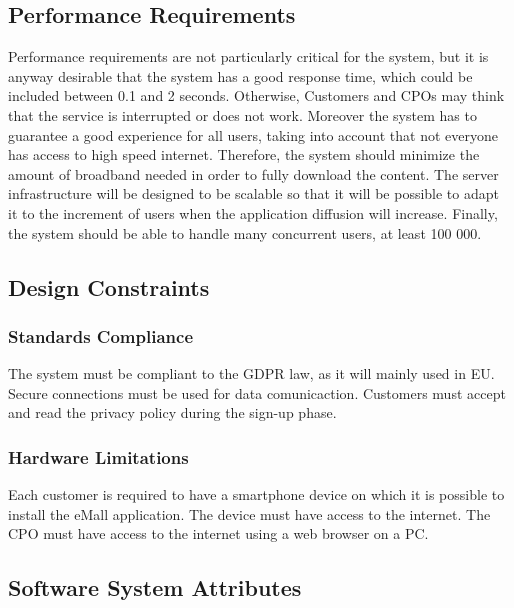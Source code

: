 \subsection{Performance Requirements}

Performance requirements are not particularly critical for the system, but it is anyway desirable that the system has a good response time, which could be included between 0.1 and 2 seconds.
Otherwise, Customers and CPOs may think that the service is interrupted or does not work.
Moreover the system has to guarantee a good experience for all users, taking into account that not everyone has access to high speed internet. Therefore,
the system should minimize the amount of broadband needed in order to fully
download the content.
The server infrastructure will be designed to be scalable so that it will be possible to adapt it to
the increment of users when the application diffusion will increase.
Finally, the system should be able to handle many concurrent users, at least
100 000.
\subsection{Design Constraints}
\subsubsection{Standards Compliance}

The system must be compliant to the GDPR law, as it will mainly used in EU. \newline
Secure connections must be used for data comunicaction. \newline
Customers must accept and read the privacy policy during the sign-up phase. \newline

\subsubsection{Hardware Limitations}

Each customer is required to have a smartphone device on which it is possible to install the eMall application. The device must have access to the internet. \newline
The CPO must have access to the internet using a web browser on a PC.  



\subsection{Software System Attributes}

